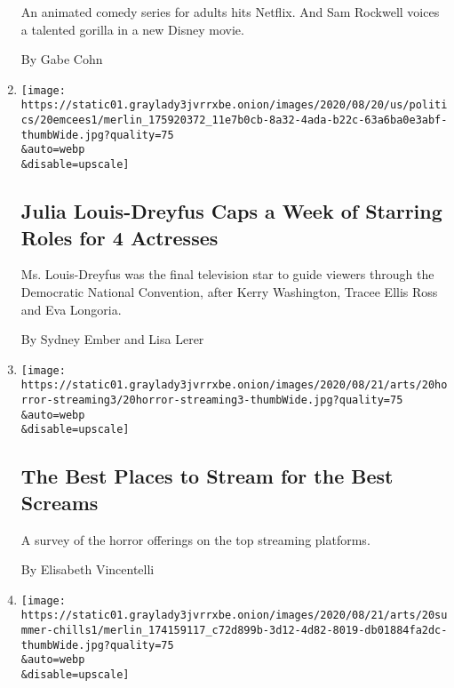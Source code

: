 \begin{enumerate}
  An animated comedy series for adults hits Netflix. And Sam Rockwell
  voices a talented gorilla in a new Disney movie.

  By Gabe Cohn
\item
  \href{/2020/08/20/us/politics/julia-louis-dreyfus-dnc.html}{}

  \texttt{[image: https://static01.graylady3jvrrxbe.onion/images/2020/08/20/us/politics/20emcees1/merlin\_175920372\_11e7b0cb-8a32-4ada-b22c-63a6ba0e3abf-thumbWide.jpg?quality=75\\\&auto=webp\\\&disable=upscale]}

  \hypertarget{julia-louis-dreyfus-caps-a-week-of-starring-roles-for-4-actresses}{%
  \subsection{Julia Louis-Dreyfus Caps a Week of Starring Roles for 4
  Actresses}\label{julia-louis-dreyfus-caps-a-week-of-starring-roles-for-4-actresses}}

  Ms. Louis-Dreyfus was the final television star to guide viewers
  through the Democratic National Convention, after Kerry Washington,
  Tracee Ellis Ross and Eva Longoria.

  By Sydney Ember and Lisa Lerer
\item
  \href{/2020/08/20/movies/horror-streaming-sevices.html}{}

  \texttt{[image: https://static01.graylady3jvrrxbe.onion/images/2020/08/21/arts/20horror-streaming3/20horror-streaming3-thumbWide.jpg?quality=75\\\&auto=webp\\\&disable=upscale]}

  \hypertarget{the-best-places-to-stream-for-the-best-screams}{%
  \subsection{The Best Places to Stream for the Best
  Screams}\label{the-best-places-to-stream-for-the-best-screams}}

  A survey of the horror offerings on the top streaming platforms.

  By Elisabeth Vincentelli
\item
  \href{/2020/08/20/movies/scary-movies-summer.html}{}

  \texttt{[image: https://static01.graylady3jvrrxbe.onion/images/2020/08/21/arts/20summer-chills1/merlin\_174159117\_c72d899b-3d12-4d82-8019-db01884fa2dc-thumbWide.jpg?quality=75\\\&auto=webp\\\&disable=upscale]}

  \hypertarget{scary-movies-for-when-the-world-is-a-fright}{%
}
\end{enumerate}

